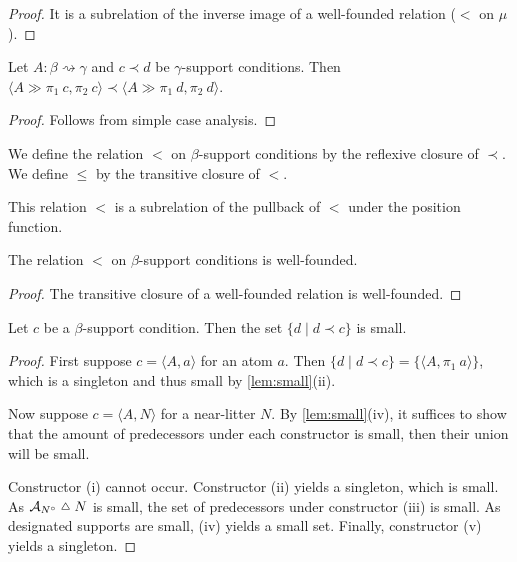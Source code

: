 \begin{proof}
    It is a subrelation of the inverse image of a well-founded relation (\( < \) on \( \mu \)).
\end{proof}
\begin{lemma}
    Let \( A : \beta \rightsquigarrow \gamma \) and \( c \prec d \) be \( \gamma \)-support conditions.
    Then \( \langle A \gg \pi_1\ c, \pi_2\ c \rangle \prec \langle A \gg \pi_1\ d, \pi_2\ d \rangle \).
\end{lemma}
\begin{proof}
    Follows from simple case analysis.
\end{proof}
\begin{definition}
    We define the relation \( < \) on \( \beta \)-support conditions by the reflexive closure of \( \prec \).
    We define \( \leq \) by the transitive closure of \( < \).
\end{definition}
\begin{remark}
    This relation \( < \) is a subrelation of the pullback of \( < \) under the position function.
\end{remark}
\begin{lemma}
    The relation \( < \) on \( \beta \)-support conditions is well-founded.
\end{lemma}
\begin{proof}
    The transitive closure of a well-founded relation is well-founded.
\end{proof}
\begin{lemma}
    \label{lem:small_constrains}
    Let \( c \) be a \( \beta \)-support condition.
    Then the set \( \{d \mid d \prec c\} \) is small.
\end{lemma}
\begin{proof}
    First suppose \( c = \langle A, a \rangle \) for an atom \( a \).
    Then \( \{d \mid d \prec c\} = \{\langle A, \pi_1\ a \rangle\} \), which is a singleton and thus small by \cref{lem:small}(ii).

    Now suppose \( c = \langle A, N \rangle \) for a near-litter \( N \).
    By \cref{lem:small}(iv), it suffices to show that the amount of predecessors under each constructor is small, then their union will be small.

    Constructor (i) cannot occur.
    Constructor (ii) yields a singleton, which is small.
    As \( \mathcal A_{N^\circ} \symmdiff N \) is small, the set of predecessors under constructor (iii) is small.
    As designated supports are small, (iv) yields a small set.
    Finally, constructor (v) yields a singleton.
\end{proof}
